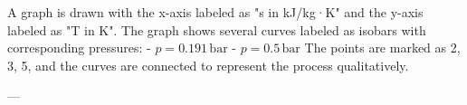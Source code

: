 A graph is drawn with the x-axis labeled as "s in kJ/kg·K" and the y-axis labeled as "T in K". The graph shows several curves labeled as isobars with corresponding pressures:  
- \( p = 0.191 \, \text{bar} \)  
- \( p = 0.5 \, \text{bar} \)  
The points are marked as 2, 3, 5, and the curves are connected to represent the process qualitatively.  

---
